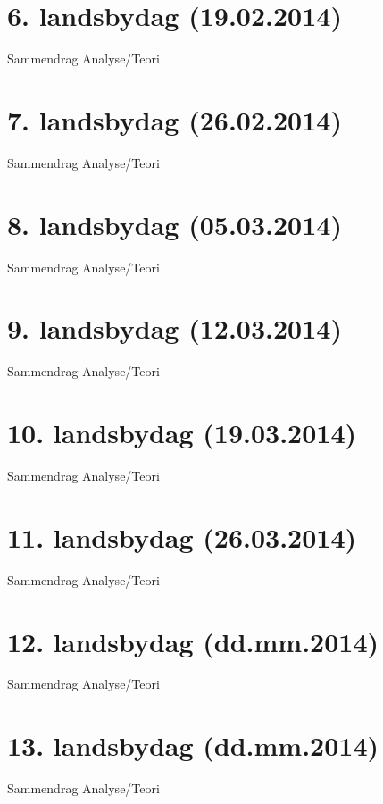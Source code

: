 \section{6. landsbydag (19.02.2014)}
Sammendrag
\vspace{\secspace}
Analyse/Teori

\section{7. landsbydag (26.02.2014)}
Sammendrag
\vspace{\secspace}
Analyse/Teori

\section{8. landsbydag (05.03.2014)}
Sammendrag
\vspace{\secspace}
Analyse/Teori

\section{9. landsbydag (12.03.2014)}
Sammendrag
\vspace{\secspace}
Analyse/Teori

\section{10. landsbydag (19.03.2014)}
Sammendrag
\vspace{\secspace}
Analyse/Teori

\section{11. landsbydag (26.03.2014)}
Sammendrag
\vspace{\secspace}
Analyse/Teori

\section{12. landsbydag (dd.mm.2014)}
Sammendrag
\vspace{\secspace}
Analyse/Teori

\section{13. landsbydag (dd.mm.2014)}
Sammendrag
\vspace{\secspace}
Analyse/Teori
